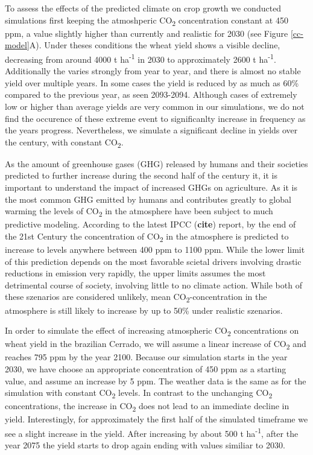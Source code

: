 \documentclass[11pt]{article}
\begin{document}
To assess the effects of the predicted climate on crop growth we conducted simulations first keeping the atmoshperic CO\textsubscript{2} concentration constant at 450 ppm, a value slightly higher than currently and realistic for 2030 (see Figure \ref{cc-model}A). Under theses conditions the wheat yield shows a visible decline, decreasing from around 4000 t ha\textsuperscript{-1} in 2030 to approximately 2600 t ha\textsuperscript{-1}. Additionally the varies strongly from year to year, and there is almost no stable yield over multiple years. In some cases the yield is reduced by as much as 60\% compared to the previous year, as seen 2093-2094. Although cases of extremely low or higher than average yields are very common in our simulations, we do not find the occurence of these extreme event to significanlty increase in frequency as the years progress. Nevertheless, we simulate a significant decline in yields over the century, with constant CO\textsubscript{2}.

As the amount of greenhouse gases (GHG) released by humans and their societies predicted to further increase during the second half of the century it, it is important to understand the impact of increased GHGs on agriculture. As it is the most common GHG emitted by humans and contributes greatly to global warming the levels of CO\textsubscript{2} in the atmosphere have been subject to much predictive modeling. According to the latest IPCC (\textbf{cite}) report, by the end of the 21st Century the concentration of CO\textsubscript{2} in the atmosphere is predicted to increase to levels anywhere between 400 ppm to 1100 ppm. While the lower limit of this prediction depends on the most favorable scietal drivers involving drastic reductions in emission very rapidly, the upper limits assumes the most detrimental course of society, involving little to no climate action. While both of these szenarios are considered unlikely, mean CO\textsubscript{2}-concentration in the atmosphere is still likely to increase by up to 50\% under realistic szenarios.

In order to simulate the effect of increasing atmospheric CO\textsubscript{2} concentrations on wheat yield in the brazilian Cerrado, we will assume a linear increase of CO\textsubscript{2} and reaches 795 ppm by the year 2100. Because our simulation starts in the year 2030, we have choose an appropriate concentration of 450 ppm as a starting value, and assume an increase by 5 ppm. The weather data is the same as for the simulation with constant CO\textsubscript{2} levels.
In contrast to the unchanging CO\textsubscript{2} concentrations, the increase in CO\textsubscript{2} does not lead to an immediate decline in yield. Interestingly, for approximately the first half of the simulated timeframe we see a slight increase in the yield. After increasing by about 500 t ha\textsuperscript{-1}, after the year 2075 the yield starts to drop again ending with values similiar to 2030.
\end{document}
